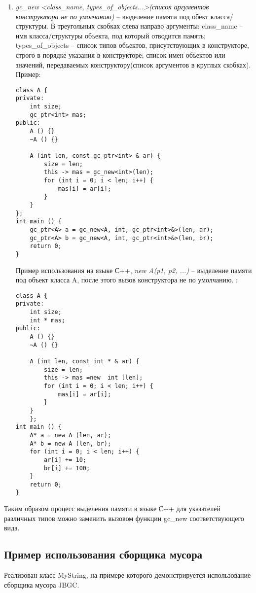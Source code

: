 \begin {enumerate}
\item \textit{gc\_new <class\_name, types\_of\_objects...>(список аргументов конструктора не по умолчанию)} -- выделение памяти под обект класса/структуры. В треугольных скобках слева направо аргументы: class\_name -- имя класса/структуры объекта, под который отводится память; types\_of\_objects -- список типов объектов, присутствующих в конструкторе, строго в порядке указания в конструкторе; список имен объектов или значений, передаваемых конструктору(список аргументов в круглых скобках). 
Пример:
 \begin{lstlisting}
class A {
private:
	int size;
	gc_ptr<int> mas;
public:
	A () {}
	~A () {}

	A (int len, const gc_ptr<int> & ar) {
		size = len;
		this -> mas = gc_new<int>(len);
		for (int i = 0; i < len; i++) {
			mas[i] = ar[i];
		}
	}
};
int main () {
	gc_ptr<A> a = gc_new<A, int, gc_ptr<int>&>(len, ar);
	gc_ptr<A> b = gc_new<A, int, gc_ptr<int>&>(len, br);
	return 0;
}
\end{lstlisting}

Пример использования на языке С++, \textit{new A(p1, p2, ...)} -- выделение памяти под объект класса A, после этого вызов конструктора не по умолчанию. :
\begin{lstlisting}
class A {
private:
	int size;
	int * mas;
public:
	A () {}
	~A () {}

	A (int len, const int * & ar) {
		size = len;
		this -> mas =new  int [len];
		for (int i = 0; i < len; i++) {
			mas[i] = ar[i];
		}
	}
	};
int main () {
	A* a = new A (len, ar);
	A* b = new A (len, br);
	for (int i = 0; i < len; i++) {
		ar[i] += 10;
		br[i] += 100;
	}
	return 0;
}
\end{lstlisting}
\end {enumerate}

Таким образом процесс выделения памяти в языке С++ для указателей различных типов можно заменить вызовом  функции gc\_new соответствующего вида.

\subsection {Пример использования сборщика мусора}
Реализован класс MyString, на примере которого демонстрируется использование сборщика мусора JBGC. 

